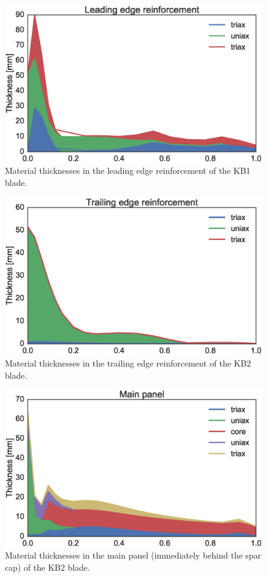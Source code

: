 \begin{figure}[!ht]
\begin{center}
	\includegraphics[width=.85\linewidth]{figures/KB1_region07.eps}
\end{center}
\caption{Material thicknesses in the leading edge reinforcement of the KB1 blade.}
\label{fig:KB1matstackr07}
\end{figure}

\begin{figure}[!ht]
\begin{center}
	\includegraphics[width=.85\linewidth]{figures/KB2_region01.eps}
\end{center}
\caption{Material thicknesses in the trailing edge reinforcement of the KB2 blade.}
\label{fig:KB2matstackr01}
\end{figure}

\begin{figure}[!ht]
\begin{center}
	\includegraphics[width=.85\linewidth]{figures/KB2_region02.eps}
\end{center}
\caption{Material thicknesses in the main panel (immediately behind the spar cap) of the KB2 blade.}
\label{fig:KB2matstackr02}
\end{figure}

